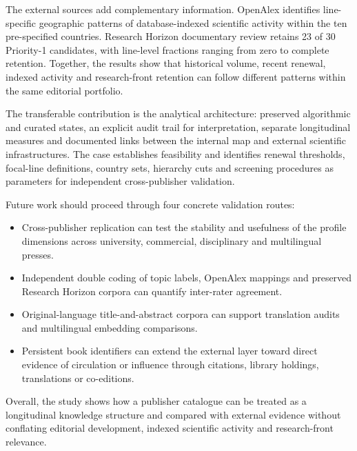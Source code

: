 \documentclass[futureinternet,article,submit,moreauthors]{Definitions/mdpi}
\begin{document}
The external sources add complementary information. OpenAlex identifies line-specific geographic patterns of database-indexed scientific activity within the ten pre-specified countries. Research Horizon documentary review retains 23 of 30 Priority-1 candidates, with line-level fractions ranging from zero to complete retention. Together, the results show that historical volume, recent renewal, indexed activity and research-front retention can follow different patterns within the same editorial portfolio.

The transferable contribution is the analytical architecture: preserved algorithmic and curated states, an explicit audit trail for interpretation, separate longitudinal measures and documented links between the internal map and external scientific infrastructures. The case establishes feasibility and identifies renewal thresholds, focal-line definitions, country sets, hierarchy cuts and screening procedures as parameters for independent cross-publisher validation.

Future work should proceed through four concrete validation routes:
\begin{itemize}
\item Cross-publisher replication can test the stability and usefulness of the profile dimensions across university, commercial, disciplinary and multilingual presses. 
\item Independent double coding of topic labels, OpenAlex mappings and preserved Research Horizon corpora can quantify inter-rater agreement. 
\item Original-language title-and-abstract corpora can support translation audits and multilingual embedding comparisons. 
\item Persistent book identifiers can extend the external layer toward direct evidence of circulation or influence through citations, library holdings, translations or co-editions.
\end{itemize}   

Overall, the study shows how a publisher catalogue can be treated as a longitudinal knowledge structure and compared with external evidence without conflating editorial development, indexed scientific activity and research-front relevance.

\vspace{6pt}

\end{document}
